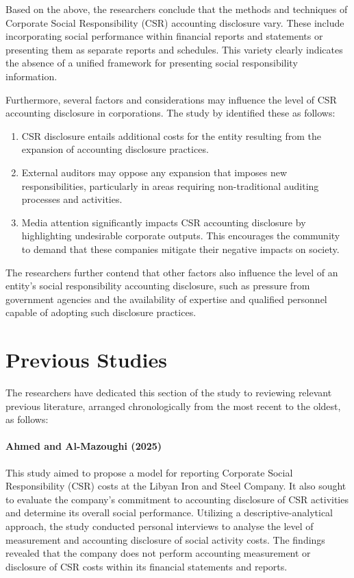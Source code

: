 \documentclass[10pt]{NSP1}
\begin{document}
Based on the above, the researchers conclude that the methods and techniques of Corporate Social Responsibility (CSR) accounting disclosure vary. These include incorporating social performance within financial reports and statements or presenting them as separate reports and schedules. This variety clearly indicates the absence of a unified framework for presenting social responsibility information.

Furthermore, several factors and considerations may influence the level of CSR accounting disclosure in corporations. The study by \cite{Oniza2013} identified these as follows:

\begin{enumerate}
    \item CSR disclosure entails additional costs for the entity resulting from the expansion of accounting disclosure practices.
    \item External auditors may oppose any expansion that imposes new responsibilities, particularly in areas requiring non-traditional auditing processes and activities.
    \item Media attention significantly impacts CSR accounting disclosure by highlighting undesirable corporate outputs. This encourages the community to demand that these companies mitigate their negative impacts on society.
\end{enumerate}

The researchers further contend that other factors also influence the level of an entity's social responsibility accounting disclosure, such as pressure from government agencies and the availability of expertise and qualified personnel capable of adopting such disclosure practices.

\section{Previous Studies}

The researchers have dedicated this section of the study to reviewing relevant previous literature, arranged chronologically from the most recent to the oldest, as follows:

\paragraph{Ahmed and Al-Mazoughi (2025) \cite{Ahmed2025}} This study aimed to propose a model for reporting Corporate Social Responsibility (CSR) costs at the Libyan Iron and Steel Company. It also sought to evaluate the company's commitment to accounting disclosure of CSR activities and determine its overall social performance. Utilizing a descriptive-analytical approach, the study conducted personal interviews to analyse the level of measurement and accounting disclosure of social activity costs. The findings revealed that the company does not perform accounting measurement or disclosure of CSR costs within its financial statements and reports.
\end{document}
